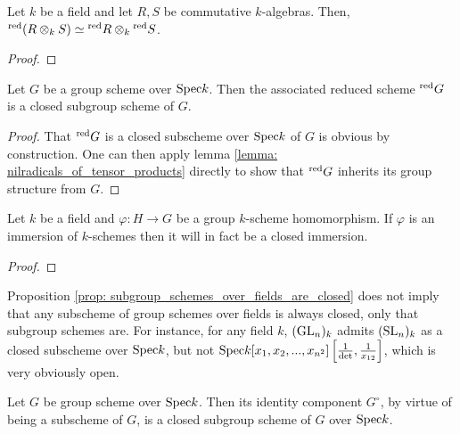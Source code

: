             \begin{lemma} \label{lemma: nilradicals_of_tensor_products}
                Let $k$ be a field and let $R, S$ be commutative $k$-algebras. Then, ${}^{\red}(R \tensor_k S) \cong {}^{\red}R \tensor_k {}^{\red}S$.
            \end{lemma}
                \begin{proof}
                    
                \end{proof}
            \begin{proposition} \label{prop: associated_reduced_group_scheme}
                Let $G$ be a group scheme over $\mathrm{Spec} k$. Then the associated reduced scheme ${}^{\mathrm{red}}G$ is a closed subgroup scheme of $G$.
            \end{proposition}
                \begin{proof}
                    That ${}^{\mathrm{red}}G$ is a closed subscheme over $\mathrm{Spec} k$ of $G$ is obvious by construction. One can then apply lemma \ref{lemma: nilradicals_of_tensor_products} directly to show that ${}^{\mathrm{red}}G$ inherits its group structure from $G$.
                \end{proof}
                
            \begin{proposition} \label{prop: subgroup_schemes_over_fields_are_closed}
                Let $k$ be a field and $\varphi: H \to G$ be a group $k$-scheme homomorphism. If $\varphi$ is an immersion of $k$-schemes then it will in fact be a closed immersion.
            \end{proposition}
                \begin{proof}
                    
                \end{proof}
            \begin{remark}
                Proposition \ref{prop: subgroup_schemes_over_fields_are_closed} does not imply that any subscheme of group schemes over fields is always closed, only that subgroup schemes are. For instance, for any field $k$, $(\operatorname{GL}_n)_k$ admits $(\operatorname{SL}_n)_k$ as a closed subscheme over $\mathrm{Spec} k$, but not $\mathrm{Spec} k[x_1, x_2, ..., x_{n^2}]\left[\frac{1}{\det}, \frac{1}{x_{12}}\right]$, which is very obviously open.
            \end{remark}
            \begin{corollary}
                Let $G$ be group scheme over $\mathrm{Spec} k$. Then its identity component $G^{\circ}$, by virtue of being a subscheme of $G$, is a closed subgroup scheme of $G$ over $\mathrm{Spec} k$.
            \end{corollary}
                
